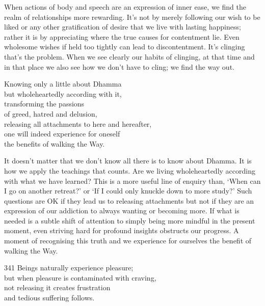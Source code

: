 \begin{dhpRefl}

When actions of body and speech are an expression of inner ease, we
find the realm of relationships more rewarding. It's not by merely
following our wish to be liked or any other gratification of desire
that we live with lasting happiness; rather it is by appreciating
where the true causes for contentment lie. Even wholesome wishes if
held too tightly can lead to discontentment. It's clinging that's the
problem. When we see clearly our habits of clinging, at that time and
in that place we also see how we don't have to cling; we find the way
out.

\end{dhpRefl}


\begin{dhpVerse}{20}
\label{dhp-20}
Knowing only a little about Dhamma\\
but wholeheartedly according with it,\\
transforming the passions\\
of greed, hatred and delusion,\\
releasing all attachments to here and hereafter,\\
one will indeed experience for oneself\\
the benefits of walking the Way.
\end{dhpVerse}

\begin{dhpRefl}

It doesn't matter that we don't know all there is to know about
Dhamma. It is how we apply the teachings that counts. Are we living
wholeheartedly according with what we have learned? This is a more
useful line of enquiry than, `When can I go on another retreat?' or
`If I could only knuckle down to more study?' Such questions are OK
if they lead us to releasing attachments but not if they are an
expression of our addiction to always wanting or becoming more. If
what is needed is a subtle shift of attention to simply being more
mindful in the present moment, even striving hard for profound
insights obstructs our progress. A moment of recognising this truth
and we experience for ourselves the benefit of walking the Way.

\end{dhpRefl}


\begin{dhpVerse}{341}
\label{dhp-341}
Beings naturally experience pleasure;\\
but when pleasure is contaminated with craving,\\
not releasing it creates frustration\\
and tedious suffering follows.
\end{dhpVerse}

